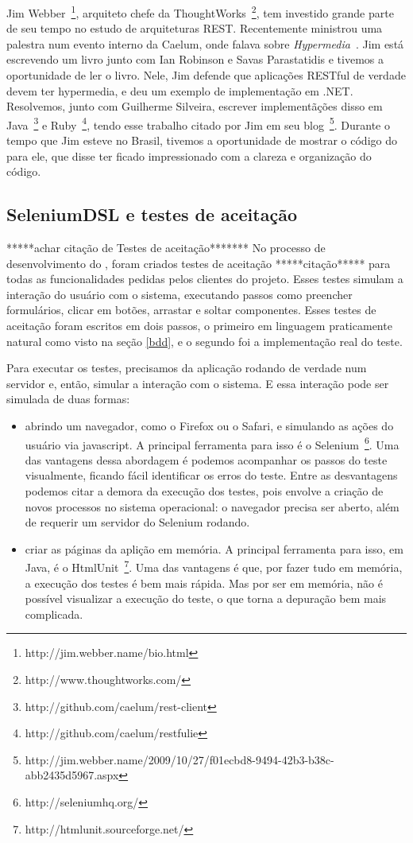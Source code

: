 Jim Webber~\footnote{http://jim.webber.name/bio.html}, arquiteto chefe da ThoughtWorks~\footnote{http://www.thoughtworks.com/},
tem investido grande parte de seu tempo no estudo de arquiteturas REST. Recentemente ministrou uma palestra num evento interno
da Caelum, onde falava sobre \textit{Hypermedia}~\cite{rest-jim}.
Jim está escrevendo um livro junto com Ian Robinson e Savas Parastatidis e tivemos a oportunidade de ler o livro. Nele, Jim 
defende que aplicações RESTful de verdade devem ter hypermedia, e deu um exemplo de implementação em .NET. Resolvemos, junto com
Guilherme Silveira, escrever implementãções disso em Java~\footnote{http://github.com/caelum/rest-client} e 
Ruby~\footnote{http://github.com/caelum/restfulie}, tendo esse trabalho citado por Jim em seu 
blog~\footnote{http://jim.webber.name/2009/10/27/f01ecbd8-9494-42b3-b38c-abb2435d5967.aspx}.
Durante o tempo que Jim esteve no Brasil, tivemos a oportunidade de mostrar o código do \calopsita para ele, que disse ter
ficado impressionado com a clareza e organização do código.

\subsection{SeleniumDSL e testes de aceitação}
*****achar citação de Testes de aceitação*******
No processo de desenvolvimento do \calopsita, foram criados testes de aceitação *****citação***** para todas as
funcionalidades pedidas pelos clientes do projeto. Esses testes simulam a interação do usuário com o sistema, executando
passos como preencher formulários, clicar em botões, arrastar e soltar componentes. Esses testes de aceitação
foram escritos em dois passos, o primeiro em linguagem praticamente natural como visto na seção \ref{bdd}, e o segundo
foi a implementação real do teste.

Para executar os testes, precisamos da aplicação rodando de verdade num servidor e, então, simular a interação com 
o sistema. E essa interação pode ser simulada de duas formas:
\begin{itemize}
	\item{abrindo um navegador, como o Firefox ou o Safari, e simulando as ações do usuário via javascript. A principal
	ferramenta para isso é o Selenium~\footnote{http://seleniumhq.org/}. Uma das vantagens dessa abordagem é podemos
	acompanhar os passos do teste visualmente, ficando fácil identificar os erros do teste. Entre as desvantagens podemos
	citar a demora da execução dos testes, pois envolve a criação de novos processos no sistema operacional: o navegador
	precisa ser aberto, além de requerir um servidor do Selenium rodando.}
	\item{criar as páginas da aplição em memória. A principal ferramenta para isso, em Java, é o 
	HtmlUnit~\footnote{http://htmlunit.sourceforge.net/}. Uma das vantagens é que, por fazer tudo em memória, a execução
	dos testes é bem mais rápida. Mas por ser em memória, não é possível visualizar a execução do teste, o que torna
	a depuração bem mais complicada.}
\end{itemize}


